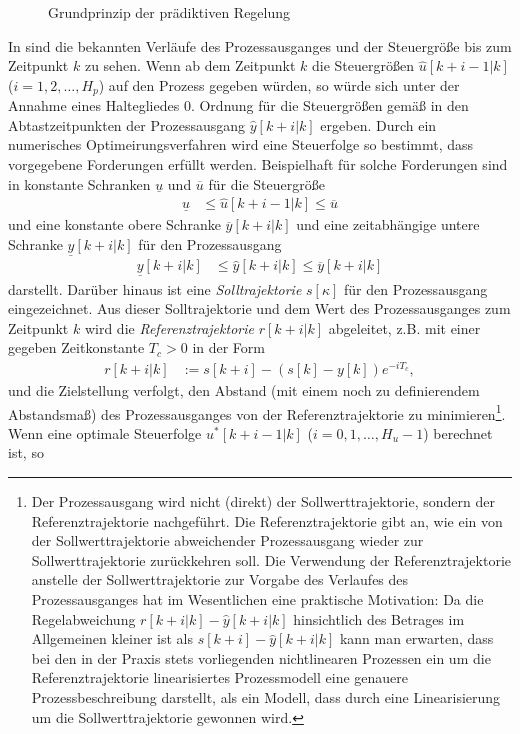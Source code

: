 \begin{figure}[htb]
	\centering
	
	\caption{Grundprinzip der prädiktiven Regelung}
	\label{fig:kap_4_grundprinzip_mpr}
\end{figure}
In  sind die bekannten Verläufe des Prozessausganges und der Steuergröße bis zum Zeitpunkt $k$ zu sehen. Wenn ab dem Zeitpunkt $k$ die Steuergrößen
$\hat{u}[k+i-1|k]$ ($i=1,2,\ldots,H_p$) auf den Prozess gegeben würden, so würde sich unter der Annahme eines Haltegliedes 0. Ordnung für die Steuergrößen gemäß
 in den Abtastzeitpunkten der Prozessausgang $\hat{y}[k+i|k]$ ergeben. Durch ein numerisches Optimeirungsverfahren wird eine Steuerfolge so bestimmt, dass
vorgegebene Forderungen erfüllt werden. Beispielhaft für solche Forderungen sind in  konstante Schranken $\underline{u}$ und $\overline{u}$ für die
Steuergröße
\begin{align}
	\underline{u}&\le \hat{u}[k+i-1|k]\le \overline{u} \label{eqn:kap_4_ugnb_u}
\end{align}
und eine konstante obere Schranke $\overline{y}[k+i|k]$ und eine zeitabhängige untere Schranke $\underline{y}[k+i|k]$ für den Prozessausgang
\begin{align}
	\underline{y}[k+i|k]&\le \hat{y}[k+i|k]\le\overline{y}[k+i|k] \label{eqn:kap_4_ugnb_y}
\end{align}
darstellt. Darüber hinaus ist eine \textit{Solltrajektorie} $s[\kappa]$ für den Prozessausgang eingezeichnet. Aus dieser Solltrajektorie und dem Wert des Prozessausganges zum Zeitpunkt
$k$ wird die \textit{Referenztrajektorie} $r[k+i|k]$ abgeleitet, z.B. mit einer gegeben Zeitkonstante $T_c>0$ in der Form
\begin{align}
	r[k+i|k] & := s[k+i]-(s[k]-y[k])e^{-iT_c},
\end{align}
und die Zielstellung verfolgt, den Abstand (mit einem noch zu definierendem Abstandsmaß) des Prozessausganges von der Referenztrajektorie zu minimieren\footnote{Der Prozessausgang wird
nicht (direkt) der Sollwerttrajektorie, sondern der Referenztrajektorie nachgeführt. Die Referenztrajektorie gibt an, wie ein von der Sollwerttrajektorie abweichender Prozessausgang
wieder zur Sollwerttrajektorie zurückkehren soll. Die Verwendung der Referenztrajektorie anstelle der Sollwerttrajektorie zur Vorgabe des Verlaufes des Prozessausganges hat im
Wesentlichen eine praktische Motivation: Da die Regelabweichung $r[k+i|k]-\hat{y}[k+i|k]$ hinsichtlich des Betrages im Allgemeinen kleiner ist als $s[k+i]-\hat{y}[k+i|k]$ kann man
erwarten, dass bei den in der Praxis stets vorliegenden nichtlinearen Prozessen ein um die Referenztrajektorie linearisiertes Prozessmodell eine genauere Prozessbeschreibung darstellt,
als ein Modell, dass durch eine Linearisierung um die Sollwerttrajektorie gewonnen wird.}. Wenn eine optimale Steuerfolge $u^{\ast}[k+i-1|k]$ ($i=0,1,\ldots,H_u-1$) berechnet ist, so

